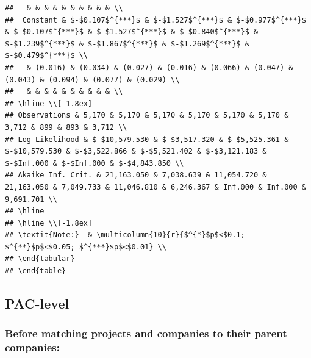 \documentclass[]{article}
\begin{document}
\begin{verbatim}
##   & & & & & & & & & & \\ 
##  Constant & $-$0.107$^{***}$ & $-$1.527$^{***}$ & $-$0.977$^{***}$ & $-$0.107$^{***}$ & $-$1.527$^{***}$ & $-$0.840$^{***}$ & $-$1.239$^{***}$ & $-$1.867$^{***}$ & $-$1.269$^{***}$ & $-$0.479$^{***}$ \\ 
##   & (0.016) & (0.034) & (0.027) & (0.016) & (0.066) & (0.047) & (0.043) & (0.094) & (0.077) & (0.029) \\ 
##   & & & & & & & & & & \\ 
## \hline \\[-1.8ex] 
## Observations & 5,170 & 5,170 & 5,170 & 5,170 & 5,170 & 5,170 & 3,712 & 899 & 893 & 3,712 \\ 
## Log Likelihood & $-$10,579.530 & $-$3,517.320 & $-$5,525.361 & $-$10,579.530 & $-$3,522.866 & $-$5,521.402 & $-$3,121.183 & $-$Inf.000 & $-$Inf.000 & $-$4,843.850 \\ 
## Akaike Inf. Crit. & 21,163.050 & 7,038.639 & 11,054.720 & 21,163.050 & 7,049.733 & 11,046.810 & 6,246.367 & Inf.000 & Inf.000 & 9,691.701 \\ 
## \hline 
## \hline \\[-1.8ex] 
## \textit{Note:}  & \multicolumn{10}{r}{$^{*}$p$<$0.1; $^{**}$p$<$0.05; $^{***}$p$<$0.01} \\ 
## \end{tabular} 
## \end{table}
\end{verbatim}

\subsection{PAC-level}\label{pac-level}

\subsubsection{Before matching projects and companies to their parent
companies:}\label{before-matching-projects-and-companies-to-their-parent-companies}
\end{document}
